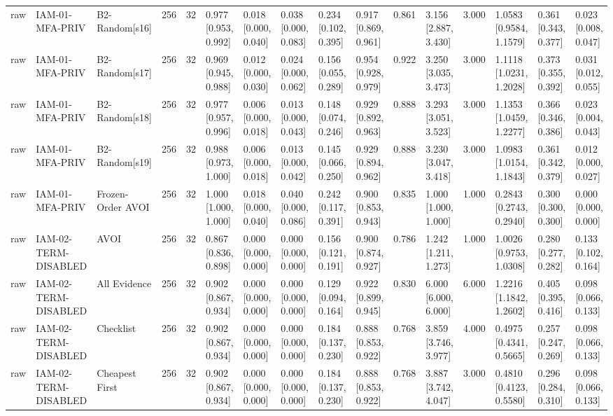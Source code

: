 \begin{table}[!ht]
{\begin{tabular}{llllllllllllllll}
raw & IAM-01-MFA-PRIV & B2-Random[s16] & 256 & 32 & 0.977 [0.953, 0.992] & 0.018 [0.000, 0.040] & 0.038 [0.000, 0.083] & 0.234 [0.102, 0.395] & 0.917 [0.869, 0.961] & 0.861 & 3.156 [2.887, 3.430] & 3.000 & 1.0583 [0.9584, 1.1579] & 0.361 [0.343, 0.377] & 0.023 [0.008, 0.047] \\
raw & IAM-01-MFA-PRIV & B2-Random[s17] & 256 & 32 & 0.969 [0.945, 0.988] & 0.012 [0.000, 0.030] & 0.024 [0.000, 0.062] & 0.156 [0.055, 0.289] & 0.954 [0.928, 0.979] & 0.922 & 3.250 [3.035, 3.473] & 3.000 & 1.1118 [1.0231, 1.2028] & 0.373 [0.355, 0.392] & 0.031 [0.012, 0.055] \\
raw & IAM-01-MFA-PRIV & B2-Random[s18] & 256 & 32 & 0.977 [0.957, 0.996] & 0.006 [0.000, 0.018] & 0.013 [0.000, 0.043] & 0.148 [0.074, 0.246] & 0.929 [0.892, 0.963] & 0.888 & 3.293 [3.051, 3.523] & 3.000 & 1.1353 [1.0459, 1.2277] & 0.366 [0.346, 0.386] & 0.023 [0.004, 0.043] \\
raw & IAM-01-MFA-PRIV & B2-Random[s19] & 256 & 32 & 0.988 [0.973, 1.000] & 0.006 [0.000, 0.018] & 0.013 [0.000, 0.042] & 0.145 [0.066, 0.250] & 0.929 [0.894, 0.962] & 0.888 & 3.230 [3.047, 3.418] & 3.000 & 1.0983 [1.0154, 1.1843] & 0.361 [0.342, 0.379] & 0.012 [0.000, 0.027] \\
raw & IAM-01-MFA-PRIV & Frozen-Order AVOI & 256 & 32 & 1.000 [1.000, 1.000] & 0.018 [0.000, 0.040] & 0.040 [0.000, 0.086] & 0.242 [0.117, 0.391] & 0.900 [0.853, 0.943] & 0.835 & 1.000 [1.000, 1.000] & 1.000 & 0.2843 [0.2743, 0.2940] & 0.300 [0.300, 0.300] & 0.000 [0.000, 0.000] \\
raw & IAM-02-TERM-DISABLED & AVOI & 256 & 32 & 0.867 [0.836, 0.898] & 0.000 [0.000, 0.000] & 0.000 [0.000, 0.000] & 0.156 [0.121, 0.191] & 0.900 [0.874, 0.927] & 0.786 & 1.242 [1.211, 1.273] & 1.000 & 1.0026 [0.9753, 1.0308] & 0.280 [0.277, 0.282] & 0.133 [0.102, 0.164] \\
raw & IAM-02-TERM-DISABLED & All Evidence & 256 & 32 & 0.902 [0.867, 0.934] & 0.000 [0.000, 0.000] & 0.000 [0.000, 0.000] & 0.129 [0.094, 0.164] & 0.922 [0.899, 0.945] & 0.830 & 6.000 [6.000, 6.000] & 6.000 & 1.2216 [1.1842, 1.2602] & 0.405 [0.395, 0.416] & 0.098 [0.066, 0.133] \\
raw & IAM-02-TERM-DISABLED & Checklist & 256 & 32 & 0.902 [0.867, 0.934] & 0.000 [0.000, 0.000] & 0.000 [0.000, 0.000] & 0.184 [0.137, 0.230] & 0.888 [0.853, 0.922] & 0.768 & 3.859 [3.746, 3.977] & 4.000 & 0.4975 [0.4341, 0.5665] & 0.257 [0.247, 0.269] & 0.098 [0.066, 0.133] \\
raw & IAM-02-TERM-DISABLED & Cheapest First & 256 & 32 & 0.902 [0.867, 0.934] & 0.000 [0.000, 0.000] & 0.000 [0.000, 0.000] & 0.184 [0.137, 0.230] & 0.888 [0.853, 0.922] & 0.768 & 3.887 [3.742, 4.047] & 3.000 & 0.4810 [0.4123, 0.5580] & 0.296 [0.284, 0.310] & 0.098 [0.066, 0.133] \\

\end{tabular}}
\end{table}
